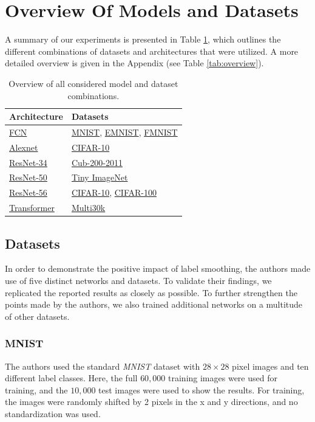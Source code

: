 \section{Overview Of Models and Datasets}
A summary of our experiments is presented in Table \ref{tab:overview_short}, which outlines the different combinations of datasets and architectures that were utilized. A more detailed overview is given in the Appendix (see Table \ref{tab:overview}).
\begin{table}[ht]
		\centering
		\caption{Overview of all considered model and dataset combinations.}
		\footnotesize		
        \renewcommand{\arraystretch}{1.4}
        \begin{tabular}{|l|l|}
        \hline\sc Architecture & \sc Datasets \\
        \hline
        \sc \hyperref[fc_model]{FCN } & \sc \hyperref[mnist]{MNIST}, \sc \hyperref[emnist]{EMNIST}, \sc \hyperref[fmnist]{FMNIST} \\
         \sc \hyperref[alexnet_model]{Alexnet} & \sc \hyperref[cifar10]{CIFAR-10} \\
         \sc \hyperref[resnet34_model]{ResNet-34} & \sc \hyperref[cub200]{Cub-200-2011} \\
         \sc \hyperref[resnet50_model]{ResNet-50} & \sc \hyperref[imagenet]{Tiny ImageNet} \\
         \sc \hyperref[resnet56_model]{ResNet-56} & \sc \hyperref[cifar10]{CIFAR-10}, \sc \hyperref[cifar100]{CIFAR-100} \\
          \sc \hyperref[transformer_model]{Transformer} & \sc \hyperref[multi30k]{Multi30k} \\
          \hline
        \end{tabular}
        \label{tab:overview_short}
\end{table}
\subsection{Datasets}
In order to demonstrate the positive impact of label smoothing, the authors made use of five distinct networks and datasets. To validate their findings, we replicated the reported results as closely as possible. To further strengthen the points made by the authors, we also trained additional networks on a multitude of other datasets.

\subsubsection{MNIST} \label{mnist}
The authors used the standard \textit{MNIST} dataset \cite{lecun1998} with $28\times28$ pixel images and ten different label classes. Here, the full $60,000$ training images were used for training, and the $10,000$ test images were used to show the results. For training, the images were randomly shifted by 2 pixels in the x and y directions, and no standardization was used.

